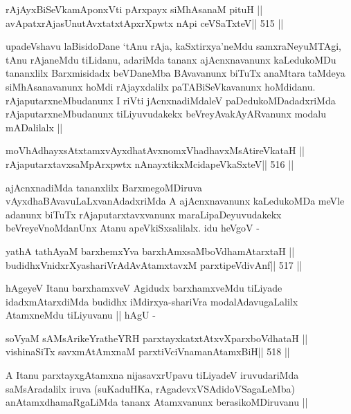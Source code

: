 \begin{shl}
rAjAyxBiSeVkamAponxVti pArxpayx siMhAsanaM pituH ||
avApatxrAjasUnutAvxtatxtApxrXpwtx nApi ceVSaTxteV\hfill || 515 ||
\end{shl}

\begin{artha}
upadeVshavu laBisidoDane `tAnu rAja, kaSxtirxya'neMdu samxraNeyuMTAgi,
tAnu rAjaneMdu tiLidanu, adariMda tananx ajAcnxnavanunx kaLedukoMDu
tananxlilx Barxmisidadx beVDaneMba BAvavanunx biTuTx anaMtara taMdeya
siMhAsanavanunx hoMdi rAjayxdalilx paTABiSeVkavanunx
hoMdidanu. rAjaputarxneMbudanunx I riVti jAcnxnadiMdaleV
paDedukoMDadadxriMda rAjaputarxneMbudanunx tiLiyuvudakekx
beVreyAvakAyARvanunx modalu mADalilalx ||
\end{artha}

\begin{shl}
moVhAdhayxsAtxtamxvAyxdhatAvxnomxVhadhavxMsAtireVkataH ||
rAjaputarxtavxsaMpArxpwtx nAnayxtikxMcidapeVkaSxteV\hfill || 516 ||
\end{shl}

\begin{artha}
ajAcnxnadiMda tananxlilx BarxmegoMDiruva
vAyxdhaBAvavuLaLxvanAdadxriMda A ajAcnxnavanunx kaLedukoMDa meVle
adanunx biTuTx rAjaputarxtavxvanunx maraLipaDeyuvudakekx
beVreyeVnoMdanUnx Atanu apeVkiSxsalilalx. idu heVgoV -
\end{artha}

\begin{shl}
yathA tathA\s yaM barxhemxYva barxhAmxsaMboVdhamAtarxtaH ||
budidhxVnidxrXyashariVrAdAvAtamxtavxM parxtipeVdivAnf\hfill || 517 ||
\end{shl}

\begin{artha}
hAgeyeV Itanu barxhamxveV Agidudx barxhamxveMdu tiLiyade
idadxmAtarxdiMda budidhx iMdirxya-shariVra modalAdavugaLalilx
AtamxneMdu tiLiyuvanu || hAgU -
\end{artha}

\begin{shl}
soV\s yaM sAMsArikeYratheYRH parxtayxkatxtAtxvXparxboVdhataH ||
vishinaSiTx savxmAtAmxnaM parxtiVciVnamanAtamxBiH\hfill || 518 ||
\end{shl}

\begin{artha}
A Itanu parxtayxgAtamxna nijasavxrUpavu tiLiyadeV iruvudariMda
saMsAradalilx iruva (suKaduHKa, rAgadevxVSAdidoVSagaLeMba)
anAtamxdhamaRgaLiMda tananx Atamxvanunx berasikoMDiruvanu ||
\end{artha}

